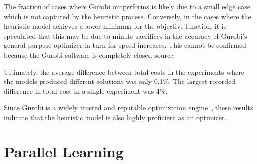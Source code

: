 \documentclass[../mthe-493-final-project.tex]{subfiles}
\begin{document}
    
    The fraction of cases where Gurobi outperforms is likely due to a small edge case which is not captured by the heuristic process. Conversely, in the cases where the heuristic model achieves a lower minimum for the objective function, it is speculated that this may be due to minute sacrifices in the accuracy of Gurobi's general-purpose optimizer in turn for speed increases. This cannot be confirmed because the Gurobi software is completely closed-source.
    
    Ultimately, the average difference between total costs in the experiments where the models produced different solutions was only 0.1\%. The largest recorded difference in total cost in a single experiment was 4\%.
    
    Since Gurobi is a widely trusted and reputable optimization engine~\cite{gurobi}, these results indicate that the heuristic model is also highly proficient as an optimizer.
    
    
    \section{Parallel Learning}
\end{document}
